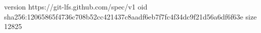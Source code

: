 version https://git-lfs.github.com/spec/v1
oid sha256:12065865f4736c708b52cc421437c8aadf6eb7f7fc4f34dc9f21d56a6df6f63e
size 12825
